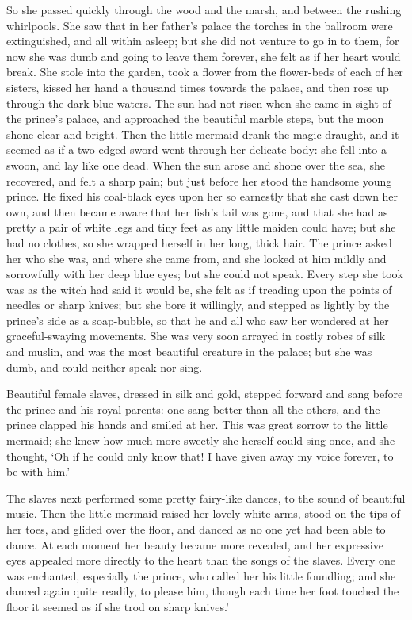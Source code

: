 So she passed quickly through the wood and the marsh, and
between the rushing whirlpools. 
She saw that in her father's palace
the torches in the ballroom were extinguished, and all within
asleep; but she did not venture to go in to them, for now she was dumb
and going to leave them forever, she felt as if her heart would break.
She stole into the garden, took a flower from the flower-beds of
each of her sisters, kissed her hand a thousand times towards the
palace, and then rose up through the dark blue waters. 
The sun had not
risen when she came in sight of the prince's palace, and approached
the beautiful marble steps, but the moon shone clear and bright.
Then the little mermaid drank the magic draught, and it seemed as if a
two-edged sword went through her delicate body: she fell into a swoon,
and lay like one dead. 
When the sun arose and shone over the sea,
she recovered, and felt a sharp pain; but just before her stood the
handsome young prince. 
He fixed his coal-black eyes upon her so
earnestly that she cast down her own, and then became aware that her
fish's tail was gone, and that she had as pretty a pair of white
legs and tiny feet as any little maiden could have; but she had no
clothes, so she wrapped herself in her long, thick hair. 
The prince
asked her who she was, and where she came from, and she looked at
him mildly and sorrowfully with her deep blue eyes; but she could
not speak. 
Every step she took was as the witch had said it would
be, she felt as if treading upon the points of needles or sharp
knives; but she bore it willingly, and stepped as lightly by the
prince's side as a soap-bubble, so that he and all who saw her
wondered at her graceful-swaying movements. 
She was very soon
arrayed in costly robes of silk and muslin, and was the most beautiful
creature in the palace; but she was dumb, and could neither speak
nor sing.

Beautiful female slaves, dressed in silk and gold, stepped forward
and sang before the prince and his royal parents: one sang better than
all the others, and the prince clapped his hands and smiled at her.
This was great sorrow to the little mermaid; she knew how much more
sweetly she herself could sing once, and she thought, `Oh if he
could only know that! I have given away my voice forever, to be with
him.'

The slaves next performed some pretty fairy-like dances, to the
sound of beautiful music. 
Then the little mermaid raised her lovely
white arms, stood on the tips of her toes, and glided over the
floor, and danced as no one yet had been able to dance. 
At each moment
her beauty became more revealed, and her expressive eyes appealed more
directly to the heart than the songs of the slaves. 
Every one was
enchanted, especially the prince, who called her his little foundling;
and she danced again quite readily, to please him, though each time
her foot touched the floor it seemed as if she trod on sharp knives.'

